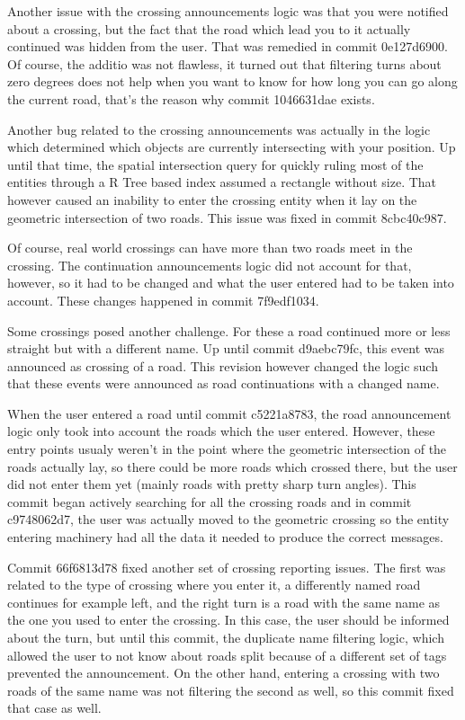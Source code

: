 \documentclass[nolof,digital]{fithesis3}
\begin{document}
Another issue with the crossing announcements logic was that you were notified about a crossing, but the fact that the road which lead you to it actually continued was hidden from the user. That was remedied in commit 0e127d6900. Of course, the additio was not flawless, it turned out that filtering turns about zero degrees does not help when you want to know for how long you can go along the current road, that's the reason why commit 1046631dae exists.

Another bug related to the crossing announcements was actually in the logic which determined which objects are currently intersecting with your position. Up until that time, the spatial intersection query for quickly ruling most of the entities through a R Tree based index assumed a rectangle without size. That however caused an inability to enter the crossing entity when it lay on the geometric intersection of two roads. This issue was fixed in commit 8cbc40c987.

Of course, real world crossings can have more than two roads meet in the crossing. The continuation announcements logic did not account for that, however, so it had to be changed and what the user entered had to be taken into account. These changes happened in commit 7f9edf1034.

Some crossings posed another challenge. For these a road continued more or less straight but with a different name. Up until commit d9aebc79fc, this event was announced as crossing of a road. This revision however changed the logic such that these events were announced as road continuations with a changed name.

When the user entered a road until commit c5221a8783, the road announcement logic only took into account the roads which the user entered. However, these entry points usualy weren't in the point where the geometric intersection of the roads actually lay, so there could be more roads which crossed there, but the user did not enter them yet (mainly roads with pretty sharp turn angles). This commit began actively searching for all the crossing roads and in commit c9748062d7, the user was actually moved to the geometric crossing so the entity entering machinery had all the data it needed to produce the correct messages.

Commit 66f6813d78 fixed another set of crossing reporting issues. The first was related to the type of crossing where you enter it, a differently named road continues for example left, and the right turn is a road with the same name as the one you used to enter the crossing. In this case, the user should be informed about the turn, but until this commit, the duplicate name filtering logic, which allowed the user to not know about roads split because of a different set of tags prevented the announcement. On the other hand, entering a crossing with two roads of the same name was not filtering the second as well, so this commit fixed that case as well.
\end{document}
